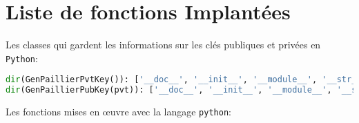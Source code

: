 	\section{Liste de fonctions Implantées}
	\label{syset:listef}
	
	Les classes qui gardent les informations sur les clés publiques et privées en \verb!Python!:
	\begin{lstlisting}[language=python,caption=Structures des Clés en Python, label=code:structgen]
dir(GenPaillierPvtKey()): ['__doc__', '__init__', '__module__', '__str__', 'lam', 'n', 'p', 'q']
dir(GenPaillierPubKey(pvt)): ['__doc__', '__init__', '__module__', '__str__', 'n']
	\end{lstlisting}

Les fonctions mises en œuvre avec la langage \verb!python!:

